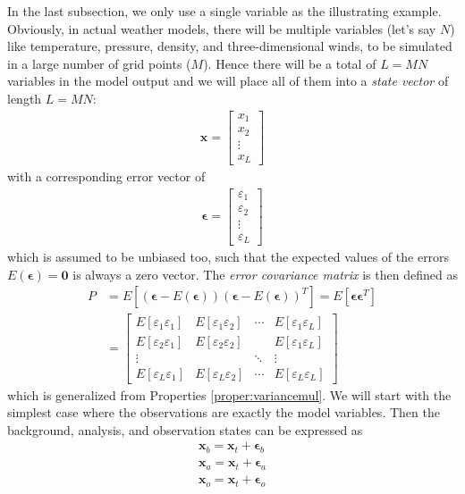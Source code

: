 In the last subsection, we only use a single variable as the illustrating example. Obviously, in actual weather models, there will be multiple variables (let's say $N$) like temperature, pressure, density, and three-dimensional winds, to be simulated in a large number of grid points ($M$). Hence there will be a total of $L = MN$ variables in the model output and we will place all of them into a \textit{state vector} of length $L = MN$:
\begin{align}
\textbf{x} = 
\begin{bmatrix}
x_1 \\
x_2 \\
\vdots \\
x_L
\end{bmatrix}
\end{align}
with a corresponding error vector of
\begin{align}
\bm{\epsilon} =  
\begin{bmatrix}
\varepsilon_1 \\
\varepsilon_2 \\
\vdots \\
\varepsilon_L
\end{bmatrix}
\end{align}
which is assumed to be unbiased too, such that the expected values of the errors $E(\bm{\epsilon}) = \textbf{0}$ is always a zero vector. The \textit{error covariance matrix} is then defined as
\begin{align}
P &= E[(\bm{\epsilon} - E(\bm{\epsilon}))(\bm{\epsilon} - E(\bm{\epsilon}))^T] = E[\bm{\epsilon}\bm{\epsilon}^T] \nonumber \\
&= \begin{bmatrix}
E[\varepsilon_1\varepsilon_1] & E[\varepsilon_1\varepsilon_2] & \cdots & E[\varepsilon_1\varepsilon_L] \\
E[\varepsilon_2\varepsilon_1] & E[\varepsilon_2\varepsilon_2] & & E[\varepsilon_1\varepsilon_L] \\
\vdots & & \ddots & \vdots \\
E[\varepsilon_L\varepsilon_1] & E[\varepsilon_L\varepsilon_2] & \cdots & E[\varepsilon_L\varepsilon_L] 
\end{bmatrix}
\end{align}
which is generalized from Properties \ref{proper:variancemul}. We will start with the simplest case where the observations are exactly the model variables. Then the background, analysis, and observation states can be expressed as
\begin{subequations}
\label{eqn:OIxbaoe}
\begin{align}
\textbf{x}_b = \textbf{x}_t + \bm{\epsilon}_b \\
\textbf{x}_a = \textbf{x}_t + \bm{\epsilon}_a \\
\textbf{x}_o = \textbf{x}_t + \bm{\epsilon}_o
\end{align}    
\end{subequations}
